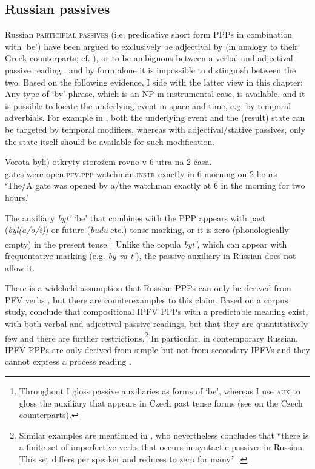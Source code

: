 \documentclass[output=paper,colorlinks,citecolor=brown]{langscibook}
\begin{document}
\subsection{Russian passives}
\label{sec:russpassives}

Russian \textsc{participial passives} (i.e. predicative short form PPPs in combination with `be') have been argued to exclusively be adjectival by \citet{Paslawska.Stechow2003} (in analogy to their Greek counterparts; cf. \citealt{anagno03}), or to be ambiguous between a verbal and adjectival passive reading \citep[]{Schoorlemmer1995,borik13,Borik.Gehrke2018}, and by form alone it is impossible to distinguish between the two. Based on the following evidence, I side with the latter view in this chapter: Any type of `by'-phrase, which is an NP in instrumental case, is available, and it is possible to locate the underlying event in space and time, e.g. by temporal adverbials. For example in  \citep[adapted from][122]{borik13}, both the underlying event and the (result) state can be targeted by temporal modifiers, whereas with adjectival/stative passives, only the state itself should be available for such modification.

\ea\label{ex:ambig}
\gll Vorota \minsp{(} byli) otkryty storožem rovno v 6 utra na 2 časa.\\
gates {} were open.\textsc{pfv.ppp} watchman.\textsc{instr} exactly in 6 morning on 2 hours\\
\glt `The/A gate was opened by a/the watchman exactly at 6 in the morning for two hours.'
\z 

\noindent The auxiliary \textit{byt'} `be' that combines with the PPP appears with past (\textit{byl(a/o/i)}) or future (\textit{budu} etc.) tense marking, or it is zero (phonologically empty) in the present tense.\footnote{Throughout I gloss passive auxiliaries as forms of `be', whereas I use \textsc{aux} to gloss the auxiliary that appears in Czech past tense forms (see  on the Czech counterparts).} Unlike the copula \textit{byt'}, which can appear with frequentative marking (e.g. \textit{by-va-t'}), the passive auxiliary in Russian does not allow it. 

There is a wideheld assumption that Russian PPPs can only be derived from PFV verbs \citep[e.g.][]{Paslawska.Stechow2003}, but there are counterexamples to this claim. Based on a corpus study, \citet{Borik.Gehrke2018} conclude that compositional IPFV PPPs with a predictable meaning exist, with both verbal and adjectival passive readings, but that they are quantitatively few and there are further restrictions.\footnote{Similar examples are mentioned in \citet{Schoorlemmer1995}, who nevertheless concludes that ``there is a finite set of imperfective verbs that occurs in syntactic passives in Russian. This set differs per speaker and reduces to zero for many.'' \citep[][226]{Schoorlemmer1995}.} In particular, in contemporary Russian, IPFV PPPs are only derived from simple but not from secondary IPFVs  \citep[from][54]{Borik.Gehrke2018} and they cannot express a process reading \citep[see also][]{knjazev07}. 
\end{document}
